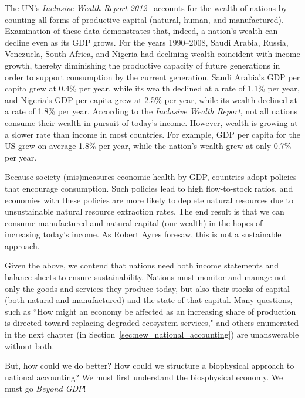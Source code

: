 The UN's \emph{Inclusive Wealth Report 2012}~\cite{IWR2012}
accounts for the wealth of nations by counting all forms of productive capital 
(natural, human, and manufactured).  
Examination of these data demonstrates that, indeed, 
a nation's wealth can decline even as its GDP grows. 
For the years 1990--2008, Saudi Arabia, Russia, Venezuela, South Africa, and Nigeria 
had declining wealth coincident with income growth,
thereby diminishing the productive capacity of future generations
in order to support consumption by the current generation.
Saudi Arabia's GDP per capita grew at 0.4\% per year, 
while its wealth declined at a rate of 1.1\% per year, 
and Nigeria's GDP per capita grew at 2.5\% per year, 
while its wealth declined at a rate of 1.8\% per year.
According to the \emph{Inclusive Wealth Report}, 
not all nations consume their wealth in pursuit of today's income. 
However, wealth is growing at a slower rate than income
in most countries.
For example, GDP per capita for the US grew on average 1.8\% per year, 
while the nation's wealth grew at only 0.7\% per year.\cite[p.~44]{IWR2012}

Because society (mis)measures economic health by GDP, 
countries adopt policies that encourage consumption.
Such policies lead to high flow-to-stock ratios,
and economies with these policies are more likely to deplete natural resources 
due to unsustainable natural resource extraction rates.
The end result is that we can consume manufactured and natural capital (our wealth) 
in the hopes of increasing today's income. 
As Robert Ayres foresaw, this is not 
a sustainable approach.

Given the above, we contend that nations need both 
income statements and
balance sheets
to ensure sustainability. 
Nations must monitor and manage not only the goods and services they produce today, 
but also their stocks of capital (both natural and manufactured)
and the state of that capital. 
Many questions, such as 
``How might an economy be affected as an increasing share of production
is directed toward replacing 
degraded ecosystem services," 
and others enumerated in the next chapter (in Section~\ref{sec:new_national_accounting})
are unanswerable without both.

But, how could we do better? 
How could we structure a biophysical approach to national accounting?
We must first understand the biosphysical economy.
We must go \emph{Beyond GDP}!


